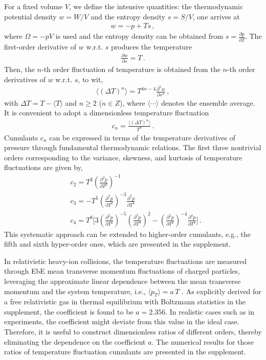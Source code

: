 \documentclass[aps,twocolumn,prd,superscriptaddress,nofootinbib,floatfix]{revtex4-2}
\begin{document}
For a fixed volume $V$, we define the intensive quantities: the thermodynamic potential density $w=W/V$ and the entropy density $s=S/V$, one arrives at
\begin{align}
    w=-p+T s\,, \label{}
\end{align}
where $\Omega=-pV$ is used and the entropy density can be obtained from $s=\frac{\partial p}{\partial T}$. The first-order derivative of $w$ w.r.t. $s$ produces the temperature
\begin{align}
    \frac{\partial w}{\partial s}=T\,. \label{}
\end{align}
Then, the $n$-th order fluctuation of temperature is obtained from the $n$-th order derivatives of $w$ w.r.t. $s$, to wit,
\begin{align}
    \langle(\Delta T)^n \rangle=T^{4n-4}\frac{\partial^n w}{\partial s^n}\,, \label{eq:DeltaTn}
\end{align}
with $\Delta T=T-\langle T \rangle$ and $n\geq 2$ ($n \in Z$), where $\langle \cdots \rangle$ denotes the ensemble average. It is convenient to adopt a dimensionless temperature fluctuation
\begin{align}
    c_n=\frac{\langle(\Delta T)^n \rangle}{T^n}\,. \label{eq:cn}
\end{align}
Cumulants $c_n$ can be expressed in terms of the temperature derivatives of pressure through fundamental thermodynamic relations. The first three nontrivial orders corresponding to the variance, skewness, and kurtosis of temperature fluctuations are given by,
\begin{equation}\label{eq:c234}\begin{split}
    & c_2=T^2\left(\frac{\partial^2 p}{\partial T^2}\right)^{-1}\,\\[2ex]
    & c_3=-T^5\left(\frac{\partial^2 p}{\partial T^2}\right)^{-3}\frac{\partial^3 p}{\partial T^3}\,\\[2ex]
    & c_4=T^8\Bigg[3\left(\frac{\partial^2 p}{\partial T^2}\right)^{-5}\left(\frac{\partial^3 p}{\partial T^3}\right)^2-\left(\frac{\partial^2 p}{\partial T^2}\right)^{-4}\frac{\partial^4 p}{\partial T^4}\Bigg]\,.
\end{split} 
\end{equation}
This systematic approach can be extended to higher-order cumulants, e.g., the fifth and sixth hyper-order ones, which are presented in the supplement.

In relativistic heavy-ion collisions, the temperature fluctuations are measured through EbE mean transverse momentum fluctuations of charged particles, leveraging the approximate linear dependence between the mean transverse momentum and the system temperature, i.e., $\langle p_{T} \rangle = a\,T$ \cite{Gardim:2019xjs, Gardim:2019brr, Giacalone:2020lbm, Gardim:2024zvi}. As explicitly derived for a free relativistic gas in thermal equilibrium with Boltzmann statistics in the supplement, the coefficient is found to be $a=2.356$. In realistic cases such as in experiments, the coefficient might deviate from this value in the ideal case. Therefore, it is useful to construct dimensionless ratios of different orders, thereby eliminating the dependence on the coefficient $a$. The numerical results for those ratios of temperature fluctuation cumulants are presented in the supplement.
\end{document}
